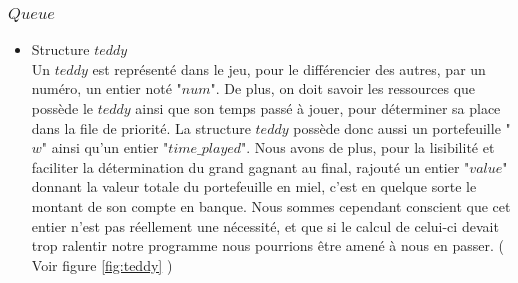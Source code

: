 \documentclass{article}
\begin{document}
    \subsubsection{$Queue$} 
    \begin{itemize}
        \item Structure $teddy$\\
    Un $teddy$ est représenté dans le jeu, pour le différencier des autres, par un numéro, un entier noté "$num$". De plus, on doit savoir les ressources que possède le $teddy$ ainsi que son temps passé à jouer, pour déterminer sa place dans la file de priorité. La structure $teddy$ possède donc aussi un portefeuille "$w$" ainsi qu'un entier "$time\_played$". Nous avons de plus, pour la lisibilité et faciliter la détermination du grand gagnant au final, rajouté un entier "$value$" donnant la valeur totale du portefeuille en miel, c'est en quelque sorte le montant de son compte en banque. Nous sommes cependant conscient que cet entier n'est pas réellement une nécessité, et que si le calcul de celui-ci devait trop ralentir notre programme nous pourrions être amené à nous en passer. ( Voir figure \ref{fig:teddy} )\\
    

\end{itemize}
\end{document}
